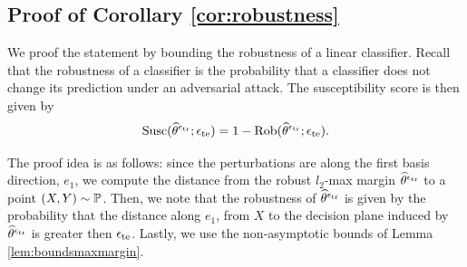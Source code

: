 \subsection{Proof of Corollary \ref{cor:robustness}}
\label{sec:proof_robust_cor}
We proof the statement by bounding the robustness of a linear classifier. Recall that the robustness of a classifier is the probability that a classifier does not change its prediction under an adversarial attack. The susceptibility score is then given by 
\begin{equation}
\label{eq:rob_sus}
\text{Susc}(\widehat{\theta}^{\epsilon_{\text{tr}}};\epsilon_{\text{te}}) = 1 - \text{Rob}(\widehat{\theta}^{\epsilon_{\text{tr}}};\epsilon_{\text{te}}).
\end{equation}

The proof idea is as follows: since the perturbations are along the first basis direction, $e_1$, we compute the distance from the robust $l_2$-max margin $\widehat{\theta}^{\epsilon_{\text{tr}}}$ to a point $(X,Y) \sim \mathbb{P}$. Then, we note that the robustness of $\widehat{\theta}^{\epsilon_{\text{tr}}}$ is given by the probability that the distance along $e_1$, from $X$ to the decision plane induced by $\widehat{\theta}^{\epsilon_{\text{tr}}}$ is greater then $\epsilon_{\text{te}}$. Lastly, we use the non-asymptotic bounds of Lemma \ref{lem:boundsmaxmargin}.

